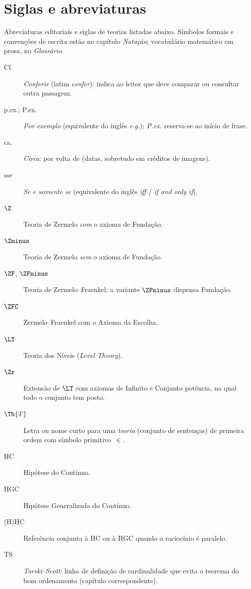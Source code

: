 
\clearpage
{}
\chapter*{Siglas e abreviaturas}

\noindent
Abreviaturas editoriais e siglas de teorias listadas abaixo. Símbolos formais e convenções de escrita estão no capítulo \emph{Notação}; vocabulário matemático em prosa, no \emph{Glossário}.

\begin{description}
\item[Cf.] \emph{Conferir} (latim \textit{confer}): indica ao leitor que deve comparar ou consultar outra passagem.
\item[p.ex.; P.ex.] \emph{Por exemplo} (equivalente do inglês \textit{e.g.}); \emph{P.ex.} reserva-se ao início de frase.
\item[ca.] \textit{Circa}: por volta de (datas, sobretudo em créditos de imagens).
\item[sse] \emph{Se e somente se} (equivalente do inglês \textit{iff} / \textit{if and only if}).
\item[$\Z$] Teoria de Zermelo \emph{com} o axioma de Fundação.
\item[$\Zminus$] Teoria de Zermelo \emph{sem} o axioma de Fundação.
\item[$\ZF$, $\ZFminus$] Teoria de Zermelo--Fraenkel; a variante $\ZFminus$ dispensa Fundação.
\item[$\ZFC$] Zermelo--Fraenkel com o Axioma da Escolha.
\item[$\LT$] Teoria dos Níveis (\textit{Level Theory}).
\item[$\Zr$] Extensão de $\LT$ com axiomas de Infinito e Conjunto potência, na qual todo o conjunto tem posto.
\item[$\Th{T}$] Letra ou nome curto para uma \emph{teoria} (conjunto de sentenças) de primeira ordem com símbolo primitivo~$\in$.
\item[HC] Hipótese do Contínuo.
\item[HGC] Hipótese Generalizada do Contínuo.
\item[(H)HC] Referência conjunta à HC ou à HGC quando o raciocínio é paralelo.
\item[TS] \emph{Tarski--Scott}: linha de definição de cardinalidade que evita o teorema do bom ordenamento (capítulo correspondente).
\end{description}
